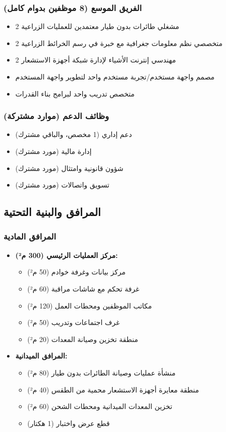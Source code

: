 \subsubsection{الفريق الموسع (8 موظفين بدوام كامل)}
\begin{itemize}
    \item 2 مشغلي طائرات بدون طيار معتمدين للعمليات الزراعية
    \item 2 متخصصي نظم معلومات جغرافية مع خبرة في رسم الخرائط الزراعية
    \item 2 مهندسي إنترنت الأشياء لإدارة شبكة أجهزة الاستشعار
    \item مصمم واجهة مستخدم/تجربة مستخدم واحد لتطوير واجهة المستخدم
    \item متخصص تدريب واحد لبرامج بناء القدرات
\end{itemize}

\subsubsection{وظائف الدعم (موارد مشتركة)}
\begin{itemize}
    \item دعم إداري (1 مخصص، والباقي مشترك)
    \item إدارة مالية (مورد مشترك)
    \item شؤون قانونية وامتثال (مورد مشترك)
    \item تسويق واتصالات (مورد مشترك)
\end{itemize}

\subsection{المرافق والبنية التحتية}

\subsubsection{المرافق المادية}
\begin{itemize}
    \item \textbf{مركز العمليات الرئيسي (300 م²):}
    \begin{itemize}
        \item مركز بيانات وغرفة خوادم (50 م²)
        \item غرفة تحكم مع شاشات مراقبة (60 م²)
        \item مكاتب الموظفين ومحطات العمل (120 م²)
        \item غرف اجتماعات وتدريب (50 م²)
        \item منطقة تخزين وصيانة المعدات (20 م²)
    \end{itemize}
    
    \item \textbf{المرافق الميدانية:}
    \begin{itemize}
        \item منشأة عمليات وصيانة الطائرات بدون طيار (80 م²)
        \item منطقة معايرة أجهزة الاستشعار محمية من الطقس (40 م²)
        \item تخزين المعدات الميدانية ومحطات الشحن (60 م²)
        \item قطع عرض واختبار (1 هكتار)
    \end{itemize}
\end{itemize}

